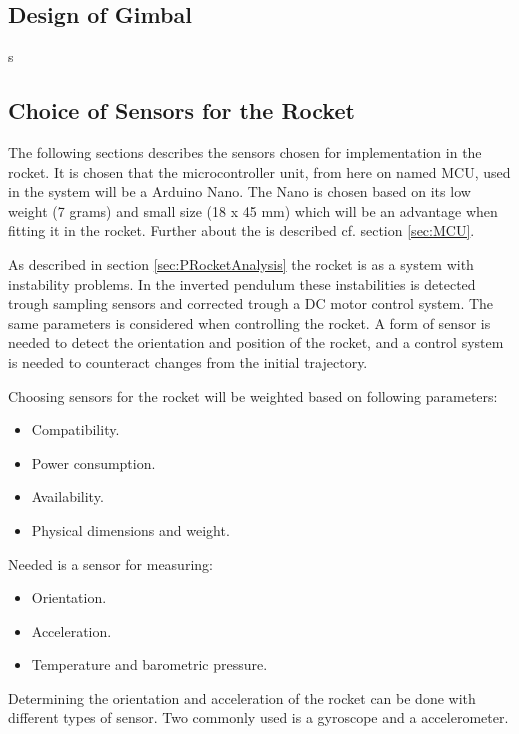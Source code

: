 \startexplain
{}
\stopexplain

\subsection{Design of Gimbal}
s


\subsection{Choice of Sensors for the Rocket}
The following sections describes the sensors chosen for implementation in the rocket. It is chosen that the microcontroller unit, from here on named MCU, used in the system will be a Arduino Nano. The Nano is chosen based on its low weight (7 grams) and small size (18 x 45 mm) which will be an advantage when fitting it in the rocket. Further about the  is described cf. section \ref{sec:MCU}.    

As described in section \ref{sec:PRocketAnalysis} the rocket is as a system with instability problems. In the inverted pendulum these instabilities is detected trough sampling sensors and corrected trough a DC motor control system. The same parameters is considered when controlling the rocket. A form of sensor is needed to detect the orientation and position of the rocket, and a control system is needed to counteract changes from the initial trajectory.

Choosing sensors for the rocket will be weighted based on following parameters:

\begin{itemize}[noitemsep]
\item Compatibility.
\item Power consumption.
\item Availability. 
\item Physical dimensions and weight.
\end{itemize}

Needed is a sensor for measuring:
\begin{itemize}[noitemsep]
\item Orientation.
\item Acceleration.
\item Temperature and barometric pressure.
\end{itemize}

Determining the orientation and acceleration of the rocket can be done with different types of sensor. Two commonly used is a gyroscope and a accelerometer. 



